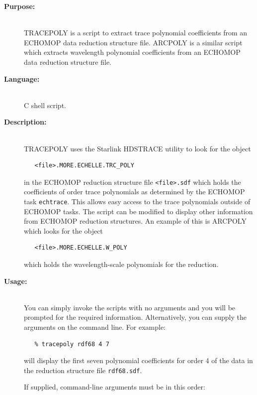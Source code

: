 \documentclass[twoside,11pt]{article}
\newcommand{\xref}[3]{#1}
\renewcommand{\_}{\texttt{\symbol{95}}}
\begin{document}
\begin{description}

\item [{\bf Purpose:}] \mbox{} \\
     TRACEPOLY is a script to extract trace polynomial coefficients from an
     \xref{ECHOMOP}{sun152}{} data reduction structure file.
     ARCPOLY is a similar script which extracts wavelength polynomial
     coefficients from an \xref{ECHOMOP}{sun152}{} data reduction structure
     file.

\item [{\bf Language:}] \mbox{} \\
     C shell script.

\item [{\bf Description:}] \mbox{} \\
     TRACEPOLY uses the Starlink \xref{HDSTRACE}{sun102}{} utility to
     look for the object
\begin{verbatim}
   <file>.MORE.ECHELLE.TRC_POLY
\end{verbatim}
     in the ECHOMOP reduction structure file \verb+<file>.sdf+ which holds
     the coefficients of order trace polynomials as determined by
     the ECHOMOP task \xref{{\tt{ech\_trace}}}{sun152}{ech_trace}.
     This allows easy access to
     the trace polynomials outside of ECHOMOP tasks.  The script
     can be modified to display other information from ECHOMOP
     reduction structures.  An example of this is ARCPOLY which looks
     for the object
\begin{verbatim}
   <file>.MORE.ECHELLE.W_POLY
\end{verbatim}
     which holds the wavelength-scale polynomials for the reduction.

\item [{\bf Usage:}] \mbox{} \\
     You can simply invoke the scripts with no arguments and you
     will be prompted for the required information.  Alternatively,
     you can supply the arguments on the command line.  For example:

\begin{verbatim}
   % tracepoly rdf68 4 7
\end{verbatim}

     will display the first seven polynomial coefficients for order 4
     of the data in the reduction structure file \verb+rdf68.sdf+.

     If supplied, command-line arguments must be in this order:


\end{description}
\end{document}
